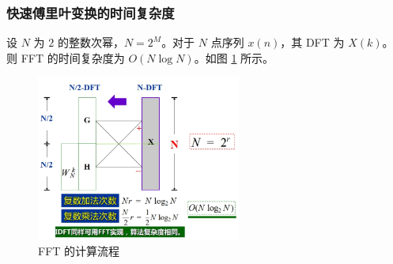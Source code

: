 \subsubsection{快速傅里叶变换的时间复杂度}

\begin{theorem}
    设 $N$ 为 $2$ 的整数次幂，$N = 2^M$。对于 $N$ 点序列 $x(n)$，其 DFT 为 $X(k)$。
    则 FFT 的时间复杂度为 $O(N\log N)$。如图 \ref{fig:FFT_calc} 所示。
    \begin{figure}[H]
        \centering
        \includegraphics[width = 0.6\textwidth]{chap3/img/FFT_calc.png}
        \caption{FFT 的计算流程}
        \label{fig:FFT_calc}
    \end{figure}
\end{theorem}
